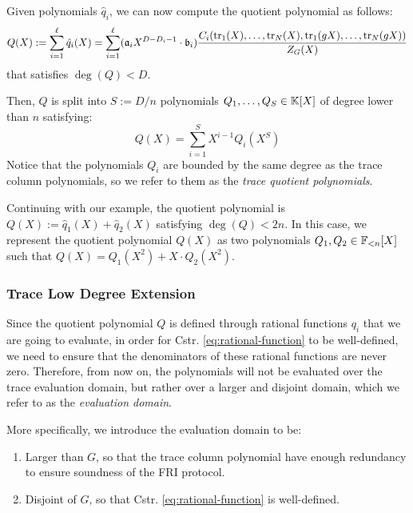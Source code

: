 Given polynomials $\hat{q}_i$, we can now compute the quotient polynomial as follows:
\begin{equation}\label{eq:quotient-polynomial}
Q(X) := \sum_{i=1}^{\ell} \hat{q}_i(X) = \sum_{i=1}^{\ell} (\mathfrak{a}_iX^{D-D_i-1} \cdot  \mathfrak{b}_i) \frac{C_i(\text{tr}_1(X), \dots, \text{tr}_N(X), \text{tr}_1(gX), \dots, \text{tr}_N(gX))}{Z_{G}(X)}
\end{equation}
that satisfies $\deg(Q) < D$. 

Then, $Q$ is split into $S := D/n$ polynomials $Q_1,\dots,Q_S \in \mathbb{K}[X]$ of degree lower than $n$ satisfying:
\begin{equation}\label{eq:trace-quotient-polynomial}
Q(X) = \sum_{i=1}^S X^{i-1} Q_i(X^S)
\end{equation}
Notice that the polynomials $Q_i$ are bounded by the same degree as the trace column polynomials, so we refer to them as the \textit{trace quotient polynomials}. 

Continuing with our example, the quotient polynomial is $Q(X) := \hat{q}_1(X) + \hat{q}_2(X)$ satisfying $\deg(Q) < 2n$. In this case, we represent the quotient polynomial $Q(X)$ as two polynomials $Q_1,Q_2 \in \mathbb{F}_{<n}[X]$ such that $Q(X) = Q_1(X^2) + X \cdot Q_2(X^2)$.


\subsubsection*{Trace Low Degree Extension} 

Since the quotient polynomial $Q$ is defined through rational functions $q_i$ that we are going to evaluate, in order for Cstr. \eqref{eq:rational-function} to be well-defined, we need to ensure that the denominators of these rational functions are never zero. Therefore, from now on, the polynomials will not be evaluated over the trace evaluation domain, but rather over a larger and disjoint domain, which we refer to as the \textit{evaluation domain}.

More specifically, we introduce the evaluation domain to be:
\begin{enumerate}
	\item Larger than $G$, so that the trace column polynomial have enough redundancy to ensure soundness of the FRI protocol. 
	
	\item Disjoint of $G$, so that Cstr. \eqref{eq:rational-function} is well-defined.
\end{enumerate}

